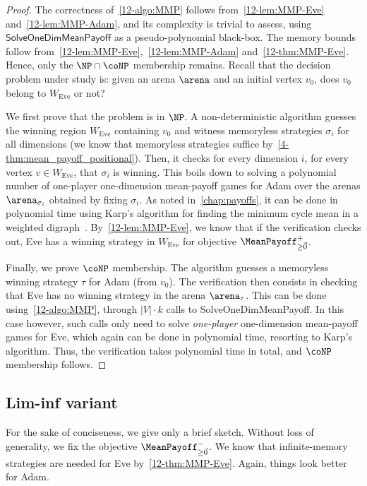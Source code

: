\begin{proof}
The correctness of~\cref{12-algo:MMP} follows from~\cref{12-lem:MMP-Eve} and~\cref{12-lem:MMP-Adam}, and its complexity is trivial to assess, using $\textsf{SolveOneDimMeanPayoff}$ as a pseudo-polynomial black-box. The memory bounds follow from~\cref{12-lem:MMP-Eve},~\cref{12-lem:MMP-Adam} and~\cref{12-thm:MMP-Eve}. Hence, only the $\NP \cap \coNP$ membership remains. Recall that the decision problem under study is: given an arena $\arena$ and an initial vertex $v_0$, does $v_0$ belong to $W_{\text{Eve}}$ or not?

We first prove that the problem is in $\NP$. A non-deterministic algorithm guesses the winning region $W_{\text{Eve}}$ containing $v_0$ and witness memoryless strategies $\sigma_i$ for all dimensions (we know that memoryless strategies suffice by~\cref{4-thm:mean_payoff_positional}). Then, it checks for every dimension $i$, for every vertex $v \in W_{\text{Eve}}$, that $\sigma_i$ is winning. This boils down to solving a polynomial number of one-player one-dimension mean-payoff games for Adam over the arenas $\arena_{\sigma_i}$ obtained by fixing $\sigma_i$. As noted in~\cref{chap:payoffs},  it can be done in polynomial time using Karp's algorithm for finding the minimum cycle mean in a weighted digraph~\cite{Karp:1978}. By~\cref{12-lem:MMP-Eve}, we know that if the verification checks out, Eve has a winning strategy in $W_{\text{Eve}}$ for objective $\MeanPayoff^{+}_{\geq \vec{0}}$.

Finally, we prove $\coNP$ membership. The algorithm guesses a memoryless winning strategy $\tau$ for Adam (from $v_0$). The verification then consists in checking that Eve has no winning strategy in the arena $\arena_{\tau}$. This can be done using~\cref{12-algo:MMP}, through $\vert V \vert \cdot k$ calls to \textsf{SolveOneDimMeanPayoff}. In this case however, such calls only need to solve \textit{one-player} one-dimension mean-payoff games for Eve, which again can be done in polynomial time, resorting to Karp's algorithm. Thus, the verification takes polynomial time in total, and $\coNP$ membership follows.
\end{proof}

\subsection*{Lim-inf variant} For the sake of conciseness, we give only a brief sketch. Without loss of generality, we fix the objective $\MeanPayoff^{-}_{\geq \vec{0}}$. We know that infinite-memory strategies are needed for Eve by~\cref{12-thm:MMP-Eve}. Again, things look better for Adam.

